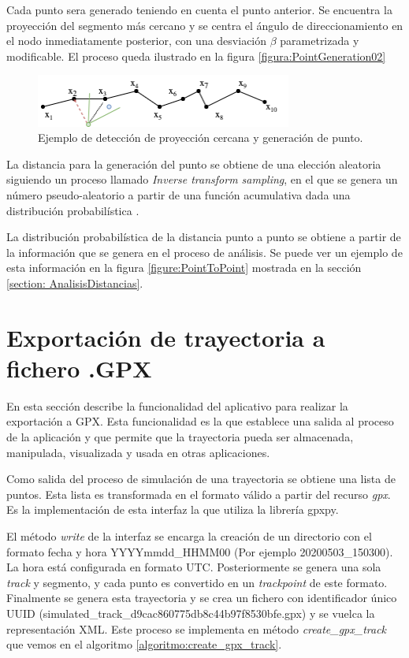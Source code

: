 Cada punto sera generado teniendo en cuenta el punto anterior. Se encuentra la proyección del segmento más cercano y se centra el ángulo de direccionamiento en el nodo inmediatamente posterior, con una desviación $\beta$ parametrizada y modificable. El proceso queda ilustrado en la figura \ref{figura:PointGeneration02}

\begin{figure}[!htb]
\begin{center}
\includegraphics[width=0.75\textwidth]{./Imagenes/PointGeneration02.png}
\caption{Ejemplo de detección de proyección cercana y generación de punto.}
\label{figure:PointGeneration02}
\end{center}
\end{figure}

La distancia para la generación del punto se obtiene de una elección aleatoria siguiendo un proceso 
llamado \textit{Inverse transform sampling}, en el que se genera un número pseudo-aleatorio a partir 
de una función acumulativa dada una distribución probabilística \cite{Sigman01}.

La distribución probabilística de la distancia punto a punto se obtiene a partir de la información 
que se genera en el proceso de análisis. Se puede ver un ejemplo de esta información en la figura \ref{figure:PointToPoint} mostrada en la sección \ref{section: AnalisisDistancias}.

\section{Exportación de trayectoria a fichero .\ac{GPX}}
En esta sección describe la funcionalidad del aplicativo para realizar la exportación a \ac{GPX}. Esta 
funcionalidad es la que establece una salida al proceso de la aplicación y que permite que la 
trayectoria pueda ser almacenada, manipulada, visualizada y usada en otras aplicaciones.

Como salida del proceso  de simulación de una trayectoria se obtiene una lista de puntos. Esta lista es 
transformada en el formato válido a partir del recurso \textit{gpx}. Es la implementación de 
esta interfaz la que utiliza la librería gpxpy. 

El método \textit{write} de la interfaz se encarga la creación de un directorio con el formato fecha y hora 
YYYYmmdd\_HHMM00 (Por ejemplo 20200503\_150300). La hora está configurada en formato 
\ac{UTC}. Posteriormente se genera una sola \textit{track} y segmento, y cada punto es convertido en 
un \textit{trackpoint} de este formato. Finalmente se genera esta trayectoria y se crea un fichero con 
identificador único \ac{UUID} (simulated\_track\_d9cac860\-775d\-b8c4\-4b97f8530bfe.gpx) y 
se vuelca la representación \ac{XML}. Este proceso se implementa en método \textit{create\_gpx\_track} que vemos en el algoritmo \ref{algoritmo:create_gpx_track}.

